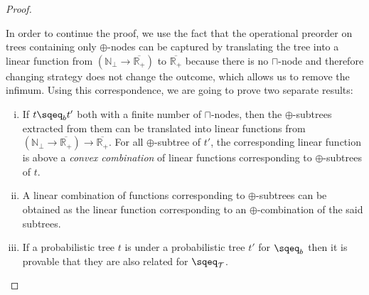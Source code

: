 \begin{proof}
\begin{center}
    \end{center}

    In order to continue the proof, we use the fact that the operational 
    preorder on trees containing only $\oplus$-nodes can be captured 
    by translating the tree into a linear function from $(\mathbb{N}_\bot \to
    \overline{\mathbb{R}_+})$ to $\overline{\mathbb{R}_+}$ because 
    there is no $\sqcap$-node and therefore changing strategy does not 
    change the outcome, which allows us to remove the infimum. Using this 
    correspondence, we are going to prove two separate results:

    \begin{enumerate}[(i)]
        \item If $t \sqeq_b t'$ both with a finite number of $\sqcap$-nodes,
            then the $\oplus$-subtrees extracted from them 
            can be translated into linear functions from $(\mathbb{N}_\bot \to
            \overline{\mathbb{R}_+}) \to \overline{\mathbb{R}_+}$. 
            For all $\oplus$-subtree 
            of $t'$, the corresponding linear function is above 
            a \emph{convex combination} of linear functions corresponding 
            to $\oplus$-subtrees of $t$.

        \item A linear combination of functions corresponding to 
            $\oplus$-subtrees can be obtained as the linear 
            function corresponding to an $\oplus$-combination 
            of the said subtrees.

        \item If a probabilistic tree $t$ is under a probabilistic tree $t'$ 
            for $\sqeq_b$ then it is provable that they are also related for
            $\sqeq_\mathcal{T}$.
    \end{enumerate}


\end{proof}
